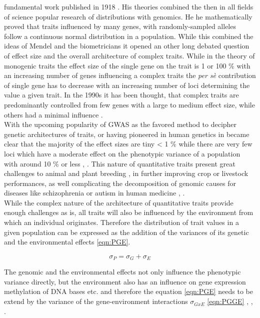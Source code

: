 fundamental work published in 1918 \cite{fisher1919xv}. His theories combined the then in all fields of science popular
research of distributions with genomics. He he mathematically proved that traits influenced by many genes, with
randomly-sampled alleles follow a continuous normal distribution in a population. While this combined the ideas of
Mendel and the biometricians it opened an other long debated question of effect size and the overall architecture of
complex traits. While in the theory of monogenic traits the effect size of the single gene on the trait is 1 or 100 \%
with an increasing number of genes influencing a complex traits the \textit{per sè} contribution of single gene has to
decrease with an increasing number of loci determining the value a given trait. In the 1990s it has been thought, that
complex traits are predominantly controlled from few genes with a large to medium effect size, while others had a
minimal influence
\cite{zhang2018esti}. \\
With the upcoming popularity of GWAS as the favored method to decipher genetic architectures of traits, or having
pioneered in human genetics in became clear that the majority of the effect sizes are tiny < 1 \% while there are very
few loci which have a moderate effect on the phenotypic variance of a population with around 10 \% or less
\cite{korte2013advantages}, \cite{stringer2011}. This nature of quantitative traits present great challenges to animal
\cite{goddard2009} and plant breeding \cite{wurschum2012}, in further improving crop or livestock performances, as well
complicating the decomposition of genomic causes for diseases like
schizophrenia or autism in human medicine \cite{de2014}, \cite{purcell2014}. \\
While the complex nature of the architecture of quantitative traits provide enough challenges as is, all traits will
also be influenced by the environment from which an individual originates. Therefore the distribution of trait values in
a given population can be expressed as the addition of the variances of its genetic and the environmental effects
\ref{eqn:PGE}.

\begin{equation}
  \sigma_{P} = \sigma_{G} + \sigma_{E}
  \label{eqn:PGE}
\end{equation}

The genomic and the environmental effects not only influence the phenotypic variance directly, but the environment also
has an influence on gene expression methylation of DNA bases etc. and therefore the equation \ref{eqn:PGE} needs to be
extend by the variance of the gene-environment interactions $\sigma_{GxE}$ \ref{eqn:PGGE} , \cite{lynch1998},
\cite{walsh2018}.
        
